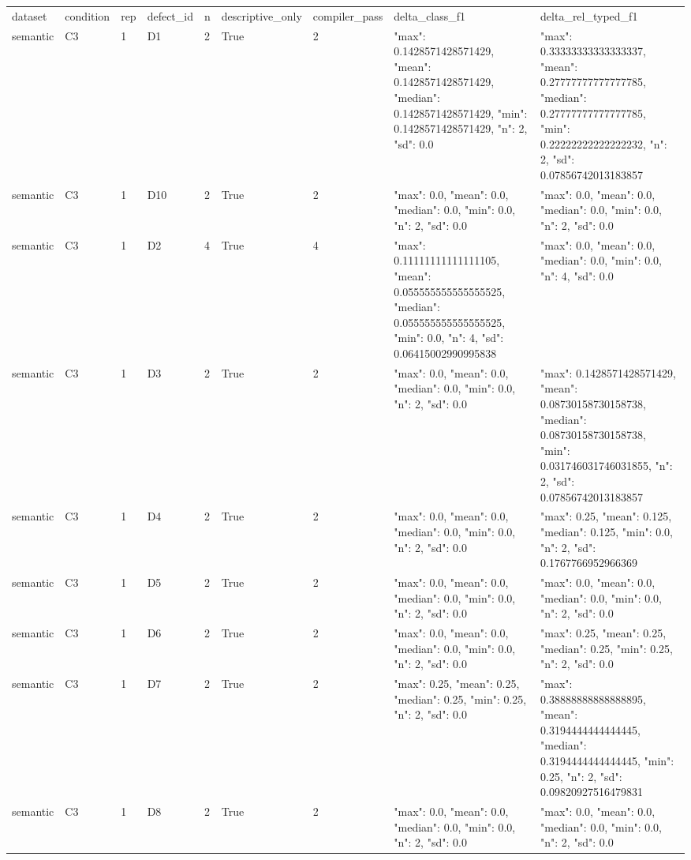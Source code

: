 \begin{tabular}{lllllllll}
dataset & condition & rep & defect\_id & n & descriptive\_only & compiler\_pass & delta\_class\_f1 & delta\_rel\_typed\_f1 \\
semantic & C3 & 1 & D1 & 2 & True & 2 & {"max": 0.1428571428571429, "mean": 0.1428571428571429, "median": 0.1428571428571429, "min": 0.1428571428571429, "n": 2, "sd": 0.0} & {"max": 0.33333333333333337, "mean": 0.27777777777777785, "median": 0.27777777777777785, "min": 0.22222222222222232, "n": 2, "sd": 0.07856742013183857} \\
semantic & C3 & 1 & D10 & 2 & True & 2 & {"max": 0.0, "mean": 0.0, "median": 0.0, "min": 0.0, "n": 2, "sd": 0.0} & {"max": 0.0, "mean": 0.0, "median": 0.0, "min": 0.0, "n": 2, "sd": 0.0} \\
semantic & C3 & 1 & D2 & 4 & True & 4 & {"max": 0.11111111111111105, "mean": 0.055555555555555525, "median": 0.055555555555555525, "min": 0.0, "n": 4, "sd": 0.06415002990995838} & {"max": 0.0, "mean": 0.0, "median": 0.0, "min": 0.0, "n": 4, "sd": 0.0} \\
semantic & C3 & 1 & D3 & 2 & True & 2 & {"max": 0.0, "mean": 0.0, "median": 0.0, "min": 0.0, "n": 2, "sd": 0.0} & {"max": 0.1428571428571429, "mean": 0.08730158730158738, "median": 0.08730158730158738, "min": 0.031746031746031855, "n": 2, "sd": 0.07856742013183857} \\
semantic & C3 & 1 & D4 & 2 & True & 2 & {"max": 0.0, "mean": 0.0, "median": 0.0, "min": 0.0, "n": 2, "sd": 0.0} & {"max": 0.25, "mean": 0.125, "median": 0.125, "min": 0.0, "n": 2, "sd": 0.1767766952966369} \\
semantic & C3 & 1 & D5 & 2 & True & 2 & {"max": 0.0, "mean": 0.0, "median": 0.0, "min": 0.0, "n": 2, "sd": 0.0} & {"max": 0.0, "mean": 0.0, "median": 0.0, "min": 0.0, "n": 2, "sd": 0.0} \\
semantic & C3 & 1 & D6 & 2 & True & 2 & {"max": 0.0, "mean": 0.0, "median": 0.0, "min": 0.0, "n": 2, "sd": 0.0} & {"max": 0.25, "mean": 0.25, "median": 0.25, "min": 0.25, "n": 2, "sd": 0.0} \\
semantic & C3 & 1 & D7 & 2 & True & 2 & {"max": 0.25, "mean": 0.25, "median": 0.25, "min": 0.25, "n": 2, "sd": 0.0} & {"max": 0.38888888888888895, "mean": 0.3194444444444445, "median": 0.3194444444444445, "min": 0.25, "n": 2, "sd": 0.09820927516479831} \\
semantic & C3 & 1 & D8 & 2 & True & 2 & {"max": 0.0, "mean": 0.0, "median": 0.0, "min": 0.0, "n": 2, "sd": 0.0} & {"max": 0.0, "mean": 0.0, "median": 0.0, "min": 0.0, "n": 2, "sd": 0.0} \\

\end{tabular}
